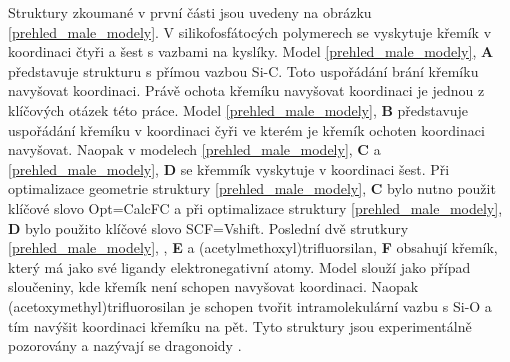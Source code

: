 \documentclass[
digital, %
table,   %
lof,     %
lot,     %
oneside,
]{fithesis3}
\begin{document}
 Struktury zkoumané v první části jsou uvedeny na obrázku \ref{prehled_male_modely}. V silikofosfátocých polymerech se vyskytuje křemík v koordinaci čtyři a šest s vazbami na kyslíky. Model  \ref{prehled_male_modely}, \textbf{A} představuje strukturu s přímou vazbou Si-C. Toto uspořádání brání křemíku navyšovat koordinaci. Právě ochota křemíku navyšovat koordinaci je jednou z klíčových otázek této práce. Model  \ref{prehled_male_modely}, \textbf{B} představuje uspořádání křemíku v koordinaci čyři ve kterém je křemík ochoten koordinaci navyšovat. Naopak v modelech  \ref{prehled_male_modely}, \textbf{C} a  \ref{prehled_male_modely}, \textbf{D} se křemmík vyskytuje v koordinaci šest. Při optimalizace geometrie struktury   \ref{prehled_male_modely}, \textbf{C} bylo nutno použit klíčové slovo Opt=CalcFC a při optimalizace struktury  \ref{prehled_male_modely}, \textbf{D} bylo použito klíčové slovo SCF=Vshift. Poslední dvě strutkury  \ref{prehled_male_modely}, ,  \textbf{E} a (acetylmethoxyl)trifluorsilan, \textbf{F}  obsahují křemík, který má jako své ligandy elektronegativní atomy. Model  slouží jako případ sloučeniny, kde křemík není schopen navyšovat koordinaci. Naopak (acetoxymethyl)trifluorosilan je schopen tvořit intramolekulární vazbu s Si-O a tím navýšit koordinaci křemíku na pět. Tyto  struktury jsou experimentálně pozorovány a nazývají se dragonoidy \cite{Chipanina2011}.
\end{document}
